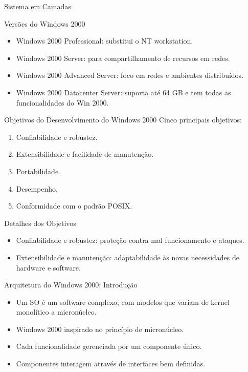 \documentclass{beamer}
\begin{document}
\begin{frame}{Sistema em Camadas}
\begin{frame}{Versões do Windows 2000}
    \begin{itemize}
        \item Windows 2000 Professional: substitui o NT workstation.
        \item Windows 2000 Server: para compartilhamento de recursos em redes.
        \item Windows 2000 Advanced Server: foco em redes e ambientes distribuídos.
        \item Windows 2000 Datacenter Server: suporta até 64 GB e tem todas as funcionalidades do Win 2000.
    \end{itemize}
\end{frame}

\begin{frame}{Objetivos do Desenvolvimento do Windows 2000}
    Cinco principais objetivos:
    \begin{enumerate}
        \item Confiabilidade e robustez.
        \item Extensibilidade e facilidade de manutenção.
        \item Portabilidade.
        \item Desempenho.
        \item Conformidade com o padrão POSIX.
    \end{enumerate}
\end{frame}

\begin{frame}{Detalhes dos Objetivos}
    \begin{itemize}
        \item Confiabilidade e robustez: proteção contra mal funcionamento e ataques.
        \item Extensibilidade e manutenção: adaptabilidade às novas necessidades de hardware e software.
    \end{itemize}
\end{frame}
\begin{frame}{Arquitetura do Windows 2000: Introdução}
    \begin{itemize}
        \item Um SO é um software complexo, com modelos que variam de kernel monolítico a micronúcleo.
        \item Windows 2000 inspirado no princípio de micronúcleo.
        \item Cada funcionalidade gerenciada por um componente único.
        \item Componentes interagem através de interfaces bem definidas.
    \end{itemize}
\end{frame}


\end{frame}
\end{document}
